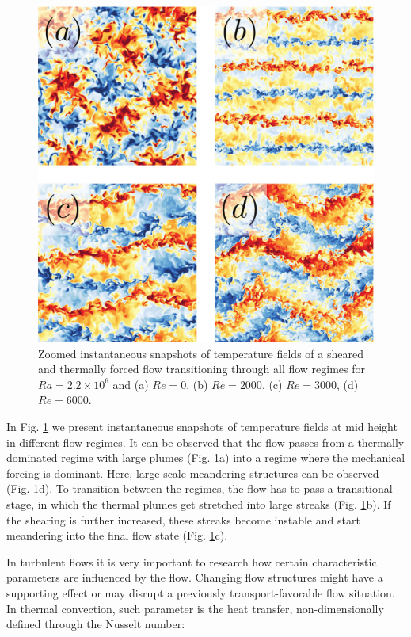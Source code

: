\documentclass[final,5p,times,twocolumn]{elsarticle}
\begin{document}
\begin{figure}
	\centering
	\includegraphics[width=\linewidth]{squaredoverview}%
	\caption{\label{fig:overview} Zoomed instantaneous snapshots of temperature fields
of a sheared and thermally forced flow transitioning through all flow regimes
for $ Ra=2.2 \times 10^6 $ and (a) $ Re=0 $, (b) $ Re=2000 $, (c) $ Re=3000 $, (d) $ Re=6000 $.}
\end{figure}

In Fig. \ref{fig:overview} we present instantaneous snapshots of temperature
fields at mid height in different flow regimes. It can be observed that the flow passes from a
thermally dominated regime with large plumes (Fig. \ref{fig:overview}a) into a
regime where the mechanical forcing is dominant. Here, large-scale meandering
structures can be observed (Fig. \ref{fig:overview}d). To transition between the
regimes, the flow has to pass a transitional stage, in which the thermal plumes
get stretched into large streaks (Fig. \ref{fig:overview}b). If the shearing is
further increased, these streaks become instable and start meandering into the
final flow state (Fig. \ref{fig:overview}c).

In turbulent flows it is very important to research how certain characteristic
parameters are influenced by the flow. Changing flow structures might have a
supporting effect or may disrupt a previously transport-favorable flow situation. 
In thermal convection, such parameter is the heat transfer, non-dimensionally
defined through the Nusselt number:
\end{document}

